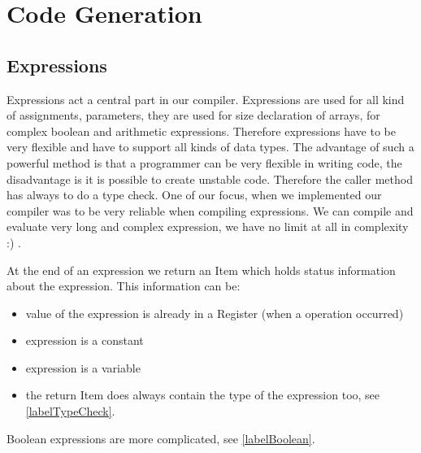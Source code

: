 \section{Code Generation}

\subsection{Expressions}

Expressions act a central part in our compiler. Expressions are used for all kind of assignments, parameters, 
they are used for size declaration of arrays, for complex boolean and arithmetic expressions. 
Therefore expressions have to be very flexible and have to support all kinds of data types. 
The advantage of such a powerful method is that a programmer can be very flexible in writing code, 
the disadvantage is it is possible to create unstable code. Therefore the caller method has always to do a type check.
One of our focus, when we implemented our compiler was to be very reliable when compiling expressions.
We can compile and evaluate very long and complex expression, we have no limit at all in complexity :) .

At the end of an expression we return an Item which holds status information about the expression.
This information can be:
\begin{itemize}
  \item value of the expression is already in a Register (when a operation occurred)
  \item expression is a constant
  \item expression is a variable
  \item the return Item does always contain the type of the expression too, see \ref{labelTypeCheck}.
\end{itemize}
Boolean expressions are more complicated, see \ref{labelBoolean}. 

